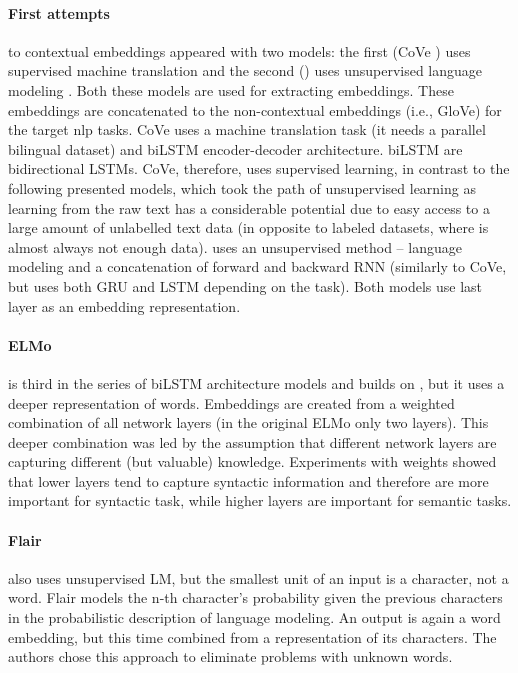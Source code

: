 \paragraph{First attempts} to contextual embeddings appeared with two models: the first (CoVe \citep{McCann2017}) uses supervised machine translation and the second (\citep{Peters2017}) uses unsupervised language modeling . Both these models are used for extracting embeddings. These embeddings are concatenated to the non-contextual embeddings (i.e., GloVe) for the target \acrshort{nlp} tasks. CoVe uses a machine translation task (it needs a parallel bilingual dataset) and biLSTM encoder-decoder architecture.  biLSTM are bidirectional LSTMs.
CoVe, therefore, uses supervised learning, in contrast to the following presented models, which took the path of unsupervised learning as learning from the raw text has a considerable potential due to easy access to a large amount of unlabelled text data (in opposite to labeled datasets, where is almost always not enough data).
\citep{Peters2017} uses an unsupervised method -- language modeling and a concatenation of forward and backward RNN (similarly to CoVe, but uses both GRU and LSTM depending on the task). Both models use last layer as an embedding representation. 
\paragraph{ELMo} is third in the series of biLSTM architecture models and builds on \citep{Peters2017}, but it uses a deeper representation of words. Embeddings are created from a weighted combination of all network layers (in the original ELMo only two layers). This deeper combination was led by the assumption that different network layers are capturing different (but valuable) knowledge. Experiments with weights showed that lower layers tend to capture syntactic information and therefore are more important for syntactic task, while higher layers are important for semantic tasks. 
\paragraph{Flair} also uses unsupervised LM, but the smallest unit of an input is a character, not a word. Flair models the n-th character's probability given the previous characters in the probabilistic description of language modeling. An output is again a word embedding, but this time combined from a representation of its characters. The authors chose this approach to eliminate problems with unknown words.
